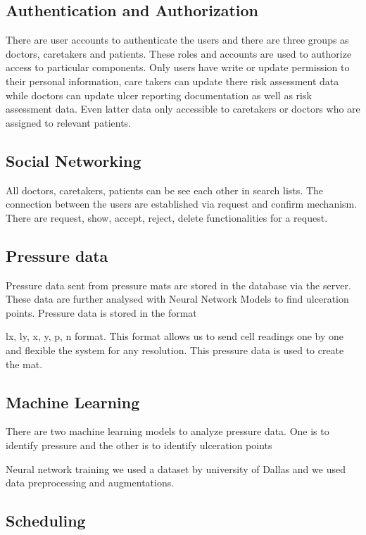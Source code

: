 \subsection{Authentication and Authorization}

There are user accounts to authenticate the users and there are three groups as doctors, caretakers and patients. These roles and accounts are used to authorize access to particular components. Only users have write or update permission to their personal information, care takers can update there risk assessment data while doctors can update ulcer reporting documentation as well as risk assessment data. Even latter data only accessible to caretakers or doctors who are assigned to relevant patients.


\subsection{Social Networking}

All doctors, caretakers, patients can be see each other in search lists. The connection between the users are established via request and confirm mechanism. There are request, show, accept, reject, delete functionalities for a request.

\subsection{Pressure data}

Pressure data sent from pressure mats are stored in the database via the server. These data are further analysed with Neural Network Models to find ulceration points. Pressure data is stored in the format 

lx, ly, x, y, p, n format. This format allows us to send cell readings one by one and flexible the system for any resolution. This pressure data is used to create the mat.

\subsection{Machine Learning}

There are two machine learning models to analyze pressure data. One is to identify pressure and the other is to identify ulceration points

Neural network training we used a dataset by university of Dallas and we used data preprocessing and augmentations.


\subsection{Scheduling}


